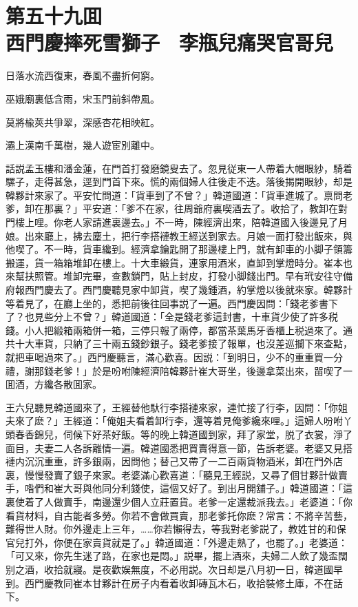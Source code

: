 
\chapter*{第五十九囬　\\西門慶摔死雪獅子　李瓶兒痛哭官哥兒}
\thispagestyle{empty}

\begin{myquote}
日落水流西復東，春風不盡折何窮。

巫娥廟裏低含雨，宋玉門前斜帶風。

莫將楡莢共爭翠，深感杏花相映紅。

灞上漢南千萬樹，幾人遊宦別離中。
\end{myquote}

話説孟玉樓和潘金蓮，在門首打發磨鏡叟去了。忽見従東一人帶着大帽眼紗，騎着騾子，走得甚急，逕到門首下來。慌的兩個婦人往後走不迭。落後揭開眼紗，却是韓夥計來家了。平安忙問道：「貨車到了不曾？」韓道國道：「貨車進城了。禀問老爹，卸在那裏？」平安道：「爹不在家，往周爺府裏喫酒去了。收拾了，教卸在對門樓上哩。你老人家請進裏邊去。」不一時，陳經濟出來，陪韓道國入後邊見了月娘。出來廳上，拂去塵土，把行李搭褳教王經送到家去。月娘一面打發出飯來，與他喫了。不一時，貨車纔到。經濟拿鑰匙開了那邊樓上門，就有卸車的小脚子領籌搬運，貨一箱箱堆卸在樓上。十大車緞貨，連家用酒米，直卸到掌燈時分。崔本也來幫扶照管。堆卸完畢，查數鎖門，貼上封皮，打發小脚錢出門。早有玳安往守備府報西門慶去了。西門慶聽見家中卸貨，喫了幾鍾酒，約掌燈以後就來家。韓夥計等着見了，在廳上坐的，悉把前後往回事説了一遍。西門慶因問：「錢老爹書下了？也見些分上不曾？」韓道國道：「全是錢老爹這封書，十車貨少使了許多税錢。小人把緞箱兩箱併一箱，三停只報了兩停，都當茶葉馬牙香櫃上税過來了。通共十大車貨，只納了三十兩五錢鈔銀子。錢老爹接了報單，也沒差巡攔下來查點，就把車喝過來了。」西門慶聽言，滿心歡喜。因説：「到明日，少不的重重買一分禮，謝那錢老爹！」於是吩咐陳經濟陪韓夥計崔大哥坐，後邊拿菜出來，㽞喫了一囬酒，方纔各散囬家。

王六兒聽見韓道國來了，王經替他馱行李搭褳來家，連忙接了行李，因問：「你姐夫來了麽？」王經道：「俺姐夫看着卸行李，還等着見俺爹纔來哩。」這婦人吩咐丫頭春香錦兒，伺候下好茶好飯。等的晚上韓道國到家，拜了家堂，脱了衣裳，淨了面目，夫妻二人各訴離情一遍。韓道國悉把買賣得意一節，告訴老婆。老婆又見搭褳内沉沉重重，許多銀兩，因問他；替己又帶了一二百兩貨物酒米，卸在門外店裏，慢慢發賣了銀子來家。老婆滿心歡喜道：「聽見王經説，又尋了個甘夥計做賣手，喒們和崔大哥與他同分利錢使，這個又好了。到出月開舖子。」韓道國道：「這裏使着了人做賣手，南邊還少個人立莊置貨。老爹一定還裁派我去。」老婆道：「你看貨材料，自古能者多勞。你若不會做買賣，那老爹托你麽？常言：不將辛苦藝，難得世人財。你外邊走上三年，……你若懶得去，等我對老爹説了，教姓甘的和保官兒打外，你便在家賣貨就是了。」韓道國道：「外邊走熟了，也罷了。」老婆道：「可又來，你先生迷了路，在家也是悶。」説畢，擺上酒來，夫婦二人飲了幾盃闊别之酒，收拾就寢。是夜歡娱無度，不必用説。次日却是八月初一日，韓道國早到。西門慶教同崔本甘夥計在房子内看着收卸磚瓦木石，收拾裝修土庫，不在話下。

